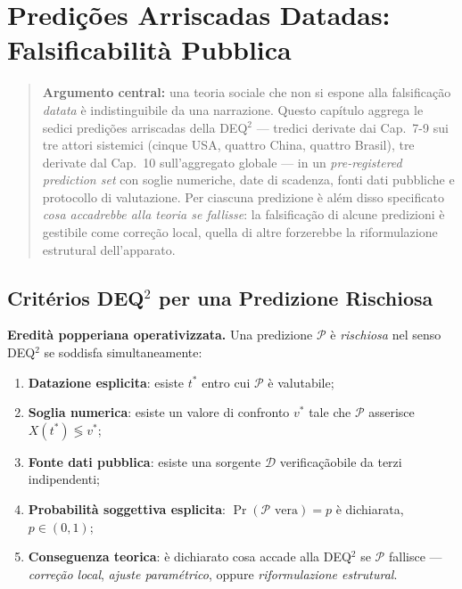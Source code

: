 \chapter{Predições Arriscadas Datadas: Falsificabilità
Pubblica}\label{predizioni-rischiose-datate-falsificabilituxe0-pubblica}

\begin{quote}
\textbf{Argumento central:} una teoria sociale che non si espone alla
falsificação \emph{datata} è indistinguibile da una narrazione. Questo
capítulo aggrega le sedici predições arriscadas della DEQ$^2$ --- tredici
derivate dai Cap.~7-9 sui tre attori sistemici (cinque USA, quattro
China, quattro Brasil), tre derivate dal Cap.~10 sull'aggregato globale
--- in un \emph{pre-registered prediction set} con soglie numeriche,
date di scadenza, fonti dati pubbliche e protocollo di valutazione. Per
ciascuna predizione è além disso specificato \emph{cosa accadrebbe alla
teoria se fallisse}: la falsificação di alcune predizioni è gestibile
come correção local, quella di altre forzerebbe la riformulazione
estrutural dell'apparato.
\end{quote}



\section{Critérios DEQ$^2$ per una Predizione
Rischiosa}\label{criteri-dequxb2-per-una-predizione-rischiosa}

\Hypoth{} \textbf{Eredità popperiana operativizzata.} Una predizione
\(\mathcal{P}\) è \emph{rischiosa} nel senso DEQ$^2$ se soddisfa
simultaneamente:

\begin{enumerate}
\def\labelenumi{\arabic{enumi}.}
\tightlist
\item
  \textbf{Datazione esplicita}: esiste \(t^*\) entro cui \(\mathcal{P}\)
  è valutabile;
\item
  \textbf{Soglia numerica}: esiste un valore di confronto \(v^*\) tale
  che \(\mathcal{P}\) asserisce \(X(t^*) \lessgtr v^*\);
\item
  \textbf{Fonte dati pubblica}: esiste una sorgente \(\mathcal{D}\)
  verificaçãobile da terzi indipendenti;
\item
  \textbf{Probabilità soggettiva esplicita}:
  \(\Pr(\mathcal{P} \text{ vera}) = p\) è dichiarata, \(p \in (0, 1)\);
\item
  \textbf{Conseguenza teorica}: è dichiarato cosa accade alla DEQ$^2$ se
  \(\mathcal{P}\) fallisce --- \emph{correção local},
  \emph{ajuste paramétrico}, oppure \emph{riformulazione
  estrutural}.
\end{enumerate}

